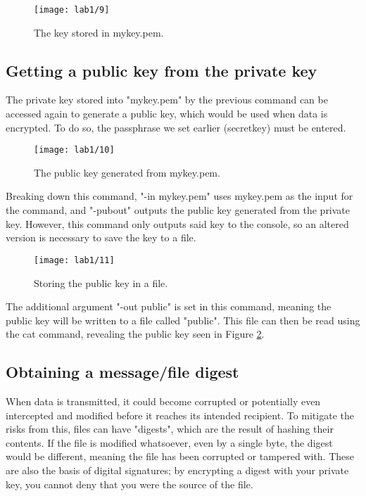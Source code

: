 \begin{figure}[H]
    \centering
    \texttt{[image: lab1/9]}
    \caption{The key stored in mykey.pem.}
    \label{fig:mykey}
\end{figure}

\subsection{Getting a public key from the private key}\label{subsec:PubFromPriv}
The private key stored into "mykey.pem" by the previous command can be accessed again to generate
a public key, which would be used when data is encrypted.
To do so, the passphrase we set earlier (secretkey) must be entered.

\begin{figure}[H]
    \centering
    \texttt{[image: lab1/10]}
    \caption{The public key generated from mykey.pem.}
    \label{fig:pubKey}
\end{figure}

Breaking down this command, "-in mykey.pem" uses mykey.pem as the input for the command, and
"-pubout" outputs the public key generated from the private key.
However, this command only outputs said key to the console, so an altered version is necessary to save
the key to a file.

\begin{figure}[H]
    \centering
    \texttt{[image: lab1/11]}
    \caption{Storing the public key in a file.}
    \label{fig:pubKeyFile}
\end{figure}

The additional argument "-out public" is set in this command, meaning the public key will be written to
a file called "public".
This file can then be read using the cat command, revealing the public key seen in Figure \ref{fig:pubKey}.

\pagebreak

\subsection{Obtaining a message/file digest}\label{subsec:hashDigest}
When data is transmitted, it could become corrupted or potentially even intercepted and modified before it
reaches its intended recipient.
To mitigate the risks from this, files can have "digests", which are the result of hashing their contents.
If the file is modified whatsoever, even by a single byte, the digest would be different, meaning the file
has been corrupted or tampered with.
These are also the basis of digital signatures; by encrypting a digest with your private key, you cannot
deny that you were the source of the file.\newline

